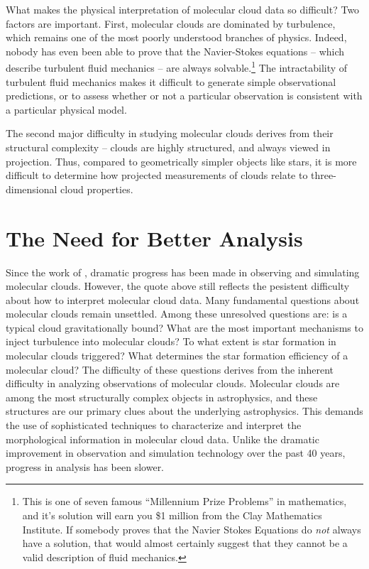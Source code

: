 What makes the physical interpretation of molecular cloud data so difficult? Two factors are important. First, molecular clouds are dominated by turbulence, which remains one of the most poorly understood branches of physics. Indeed, nobody has even been able to prove that the Navier-Stokes equations -- which describe turbulent fluid mechanics -- are always solvable.\footnote{This is one of seven famous ``Millennium Prize Problems'' in mathematics, and it's solution will earn you \$1 million from the Clay Mathematics Institute. If somebody proves that the Navier Stokes Equations do \emph{not} always have a solution, that would almost certainly suggest that they cannot be a valid description of fluid mechanics.} The intractability of turbulent fluid mechanics makes it difficult to generate simple observational predictions, or to assess whether or not a particular observation is consistent with a particular physical model.

The second major difficulty in studying molecular clouds derives from their structural complexity -- clouds are highly structured, and always viewed in projection. Thus, compared to geometrically simpler objects like stars, it is more difficult to determine how projected measurements of clouds relate to three-dimensional cloud properties.

\section{The Need for Better Analysis}

Since the work of \cite{Goldreich74}, dramatic progress has been made in observing and simulating molecular clouds. However, the quote above still reflects the pesistent difficulty about how to interpret molecular cloud data. Many fundamental questions about molecular clouds remain unsettled. Among these unresolved questions are: is a typical cloud gravitationally bound? What are the most important mechanisms to inject turbulence into molecular clouds? To what extent is star formation in molecular clouds triggered? What determines the star formation efficiency of a molecular cloud? The difficulty of these questions derives from the inherent difficulty in analyzing observations of molecular clouds. Molecular clouds are among the most structurally complex objects in astrophysics, and these structures are our primary clues about the underlying astrophysics. This demands the use of sophisticated techniques to characterize and interpret the morphological information in molecular cloud data. Unlike the dramatic improvement in observation and simulation technology over the past 40 years, progress in analysis has been slower.

